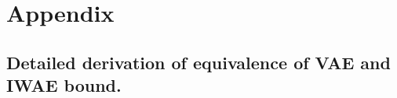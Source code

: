 \documentclass{article} %
\begin{document}


\newpage




















\section{Appendix}




\subsection{Detailed derivation of equivalence of VAE and IWAE bound.}
\end{document}

